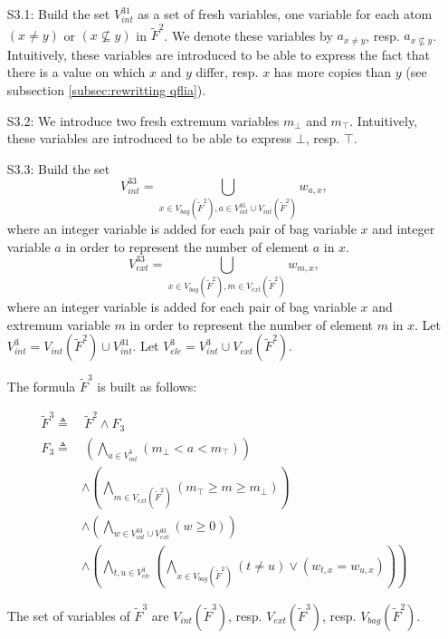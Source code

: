 \begin{enumerate}
\item[S3.1:] Build the set $V^{31}_{int}$ as a set of fresh variables, one variable for each atom $(x \neq y)$ or $(x \nsubseteq y)$ in $\tilde{F}^2$.
We denote these variables by $a_{x \neq y}$, resp. $a_{x \nsubseteq y}$.
Intuitively, these variables are introduced to be able to express the fact that there is a value on which $x$ and $y$ differ, resp. $x$ has more copies than $y$ (see subsection \ref{subsec:rewritting qflia}).

\item[S3.2:] We introduce two fresh extremum variables $m_{\bot}$ and $m_{\top}$.
Intuitively, these variables are introduced to be able to express $\bot$, resp. $\top$.

\item[S3.3:] Build the set
$$V^{33}_{int}  =
\bigcup_{x\in V_{bag}(\tilde{F}^2), a\in  V^{31}_{int}\cup V_{int}(\tilde{F}^2)} w_{a,x},$$
where an integer variable is added for each pair of bag variable $x$ and integer variable $a$ in order to represent the number of element $a$ in $x$.
$$V^{33}_{ext}  =
\bigcup_{x\in V_{bag}(\tilde{F}^2), m\in  V_{ext}(\tilde{F}^2)} w_{m,x},$$
where an integer variable is added for each pair of bag variable $x$ and extremum variable $m$ in order to represent the number of element $m$ in $x$.
Let $V^3_{int} = V_{int}(\tilde{F}^2) \cup V^{31}_{int}$.
Let $V^3_{ele} = V^3_{int} \cup V_{ext}(\tilde{F}^2)$.

The formula $\tilde{F}^3$ is built as follows:
\begin{small}\begin{align}
  \tilde{F}^3 \triangleq &\
  \tilde{F}^2 \land F_{3} \\
  F_{3 } \triangleq &\
  \left(\bigwedge_{a \in V^{3}_{int}}(m_{\bot} < a < m_{\top})\right)
  \\
  & \land
  \left(\bigwedge_{m \in V_{ext}(\tilde{F}^2)}(m_{\top} \ge m \ge m_{\bot})\right)
  \\
  & \land
  \left(\bigwedge_{w \in V^{33}_{int}\cup V^{33}_{ext}}(w \ge 0)\right)
  \\
  & \land
  \left(\bigwedge_{t,u \in V^3_{ele}}\left(\bigwedge_{x\in V_{bag}(\tilde{F}^2)}(t \neq u) \lor (w_{t,x} = w_{u,x})\right)\right)
\end{align}
\end{small}
The set of variables of $\tilde{F}^3$ are $V_{int}(\tilde{F}^3)$, resp. $V_{ext}(\tilde{F}^3)$, resp. $V_{bag}(\tilde{F}^2)$.
\end{enumerate}

